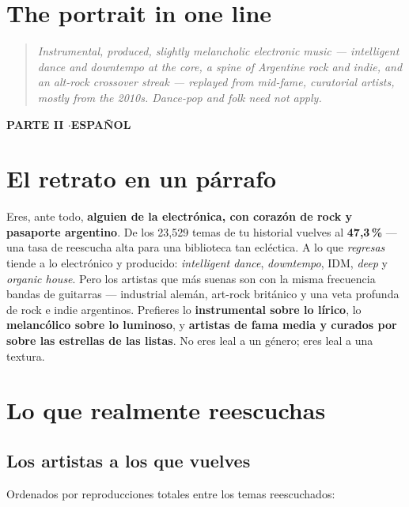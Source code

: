 \documentclass[11pt]{article}
\begin{document}
\section{The portrait in one line}
\begin{quote}\itshape
Instrumental, produced, slightly melancholic electronic music --- intelligent dance
and downtempo at the core, a spine of Argentine rock and indie, and an alt-rock
crossover streak --- replayed from mid-fame, curatorial artists, mostly from the
2010s. Dance-pop and folk need not apply.
\end{quote}

\clearpage
\begin{center}{\color{blu}\Large\bfseries PARTE II \quad$\cdot$\quad ESPAÑOL}\end{center}
\vspace{0.5em}

\section{El retrato en un párrafo}
Eres, ante todo, \textbf{alguien de la electrónica, con corazón de rock y
pasaporte argentino}. De los 23{,}529 temas de tu historial vuelves al
\textbf{47{,}3\,\%} --- una tasa de reescucha alta para una biblioteca tan
ecléctica. A lo que \emph{regresas} tiende a lo electrónico y producido:
\emph{intelligent dance}, \emph{downtempo}, IDM, \emph{deep} y \emph{organic
house}. Pero los artistas que más suenas son con la misma frecuencia bandas de
guitarras --- industrial alemán, art-rock británico y una veta profunda de rock e
indie argentinos. Prefieres lo \textbf{instrumental sobre lo lírico}, lo
\textbf{melancólico sobre lo luminoso}, y \textbf{artistas de fama media y
curados por sobre las estrellas de las listas}. No eres leal a un género; eres
leal a una textura.

\section{Lo que realmente reescuchas}
\subsection{Los artistas a los que vuelves}
Ordenados por reproducciones totales entre los temas reescuchados:
\end{document}
